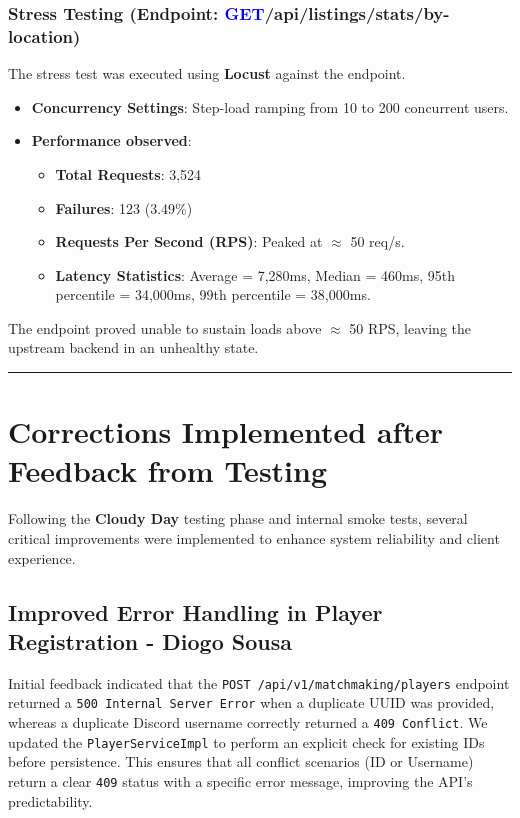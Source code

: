 \documentclass[11pt,a4paper]{article}
\newcommand{\getapi}{\textcolor{blue}{GET}}
\newcommand{\bff}[1]{\textbf{#1}}
\begin{document}
 \subsubsection{Stress Testing (Endpoint: \getapi /api/listings/stats/by-location)}
 The stress test was executed using \bff{Locust} against the endpoint.
 \begin{itemize}
  \item \bff{Concurrency Settings}: Step-load ramping from 10 to 200 concurrent users.
  \item \bff{Performance observed}:
  \begin{itemize}
   \item \bff{Total Requests}: 3,524
   \item \bff{Failures}: 123 (3.49\%)
   \item \bff{Requests Per Second (RPS)}: Peaked at $\approx$ 50 req/s.
   \item \bff{Latency Statistics}: Average = 7,280ms, Median = 460ms, 95th percentile = 34,000ms, 99th percentile = 38,000ms.
  \end{itemize}
 \end{itemize}
 The endpoint proved unable to sustain loads above $\approx$ 50 RPS, leaving the upstream backend in an unhealthy state.

 \vspace{1cm}
 \hrule
 \vspace{1cm}

 \section{Corrections Implemented after Feedback from Testing}

 Following the \bff{Cloudy Day} testing phase and internal smoke tests, several critical improvements were implemented to enhance system reliability and client experience.

 \subsection{Improved Error Handling in Player Registration - Diogo Sousa}
 Initial feedback indicated that the \texttt{POST /api/v1/matchmaking/players} endpoint returned a \texttt{500 Internal Server Error} when a duplicate UUID was provided, whereas a duplicate Discord username correctly returned a \texttt{409 Conflict}. We updated the \texttt{PlayerServiceImpl} to perform an explicit check for existing IDs before persistence. This ensures that all conflict scenarios (ID or Username) return a clear \texttt{409} status with a specific error message, improving the API's predictability.
\end{document}
